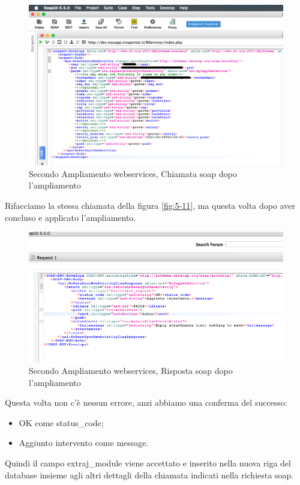 \begin{figure}[!h] 
	\centering
	\includegraphics[scale = 0.5]{immagini/webservices/ampliamenti/accettazione/2ampl_soap_chiamata_premodifica.png}
	\caption{Secondo Ampliamento webservices, Chiamata \gls{soap} dopo l'ampliamento}
\end{figure}

\begin{flushleft}
	Rifacciamo la stessa chiamata della figura \ref{fig:5-11}, ma questa volta dopo aver concluso e applicato l'ampliamento.
\end{flushleft}

\begin{figure}[!h] 
	\centering
	\includegraphics[scale = 0.5]{immagini/webservices/ampliamenti/accettazione/2ampl_soap_risposta_postmodifica.png}
	\caption{Secondo Ampliamento webservices, Risposta \gls{soap} dopo l'ampliamento}
\end{figure}
\begin{flushleft}
	Questa volta non c'è nessun errore, anzi abbiamo una conferma del successo:
	\begin{itemize}
		\item OK come status\_code;
		\item Aggiunto intervento come message.
	\end{itemize}
	
	Quindi il campo extraj\_module viene accettato e inserito nella nuova riga del database insieme agli altri dettagli della chiamata indicati nella richiesta \gls{soap}.
\end{flushleft}
\newpage

